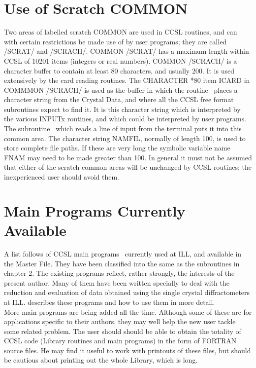 \section{Use of Scratch COMMON}
Two areas of labelled scratch COMMON are used in CCSL routines,
and can with certain restrictions be made use of by user programs;
they are called /SCRAT/ and /SCRACH/.\p
COMMON /SCRAT/ has a maximum length
within CCSL of 10201 items (integers or real numbers).\p
COMMON /SCRACH/ is a character buffer to
contain at least 80 characters, and usually 200.\p
It is used extensively by the card reading routines.
The CHARACTER *80 item ICARD in COMMMON /SCRACH/ is used as
the buffer in which the routine \ places a character string from the
Crystal Data, and where all the CCSL free format subroutines expect to find it. 
It is this character
string which is interpreted by the various INPUTx routines, and which
could be interpreted by user programs. The subroutine \ which reads a line of
input from the terminal puts it into this common area.\p 
The character string NAMFIL, normally of length 100, is used to store complete
file paths. If these are very long the symbolic variable name FNAM may need
to be made greater than 100.
In general it must not be assumed that either of the scratch common
areas will be unchanged by CCSL routines;  the inexperienced user should 
avoid them.
\section{Main Programs Currently Available}
A list follows of 
{CCSL main programs}%
\ currently used at ILL, and available in the 
Master File. They have been classified into the same
 as the subroutines
in chapter 2. The existing programs reflect, rather strongly, the interests of 
the present
author. Many of them have been written specially to deal with the reduction
and evaluation of data obtained using the single crystal diffractometers at ILL.
  describes these programs and 
how to use them in more detail. 
\\[1ex]
%
\ms 
More main programs are being added all the time.  Although some of these
are for applications specific to their authors, they may well help the
new user tackle some related problem.\p
The user should should be able to obtain the totality of CCSL code
(Library routines and main programs) in the form of
FORTRAN source files. He may find it useful to work with printouts of these files, but should
be cautious about printing out the whole Library, which is long.\\[1cm] 
